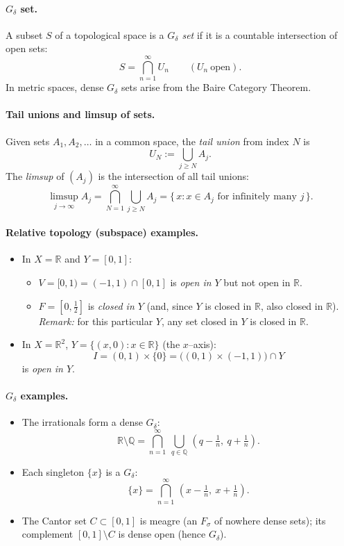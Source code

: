 \documentclass[11pt,a4paper]{article}
\theoremstyle{definition}
\theoremstyle{definition}
\theoremstyle{plain}
\theoremstyle{remark}
\begin{document}
\paragraph{$G_\delta$ set.}
A subset $S$ of a topological space is a \emph{$G_\delta$ set} if it is a countable
intersection of open sets:
\[
S=\bigcap_{n=1}^\infty U_n \qquad (U_n\ \text{open}).
\]
In metric spaces, dense $G_\delta$ sets arise from the Baire Category Theorem.

\paragraph{Tail unions and limsup of sets.}
Given sets $A_1,A_2,\dots$ in a common space, the \emph{tail union} from index $N$
is
\[
U_N := \bigcup_{j\ge N} A_j .
\]
The \emph{limsup} of $(A_j)$ is the intersection of all tail unions:
\[
\limsup_{j\to\infty} A_j
= \bigcap_{N=1}^\infty \bigcup_{j\ge N} A_j
= \{\, x : x\in A_j \text{ for infinitely many $j$} \,\}.
\]


\paragraph{Relative topology (subspace) examples.}
\begin{itemize}
	\item In $X=\mathbb R$ and $Y=[0,1]$:
	\begin{itemize}
		\item $V=[0,1)=(-1,1)\cap[0,1]$ is \emph{open in $Y$} but not open in $\mathbb R$.
		\item $F=[0,\tfrac12]$ is \emph{closed in $Y$} (and, since $Y$ is closed in $\mathbb R$, also closed in $\mathbb R$).
		\emph{Remark:} for this particular $Y$, any set closed in $Y$ is closed in $\mathbb R$.
	\end{itemize}
	\item In $X=\mathbb R^2$, $Y=\{(x,0):x\in\mathbb R\}$ (the $x$–axis):
	\[
	I=(0,1)\times\{0\}=\bigl((0,1)\times(-1,1)\bigr)\cap Y
	\]
	is \emph{open in $Y$}.
\end{itemize}

\paragraph{$G_\delta$ examples.}
\begin{itemize}
	\item The irrationals form a dense $G_\delta$:
	\[
	\mathbb R\setminus\mathbb Q=\bigcap_{n=1}^{\infty}\ \bigcup_{q\in\mathbb Q}\,(q-\tfrac1n,\ q+\tfrac1n).
	\]
	\item Each singleton $\{x\}$ is a $G_\delta$:
	\[
	\{x\}=\bigcap_{n=1}^{\infty}\,(x-\tfrac1n,\ x+\tfrac1n).
	\]
	\item The Cantor set $C\subset[0,1]$ is meagre (an $F_\sigma$ of nowhere dense sets);
	its complement $[0,1]\setminus C$ is dense open (hence $G_\delta$).
\end{itemize}
\end{document}
